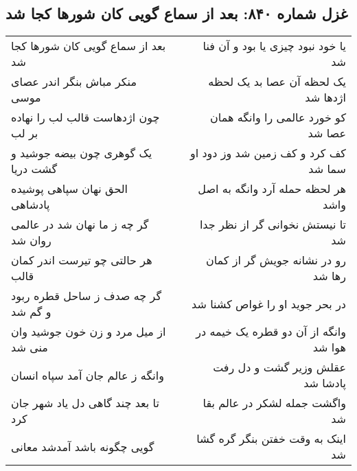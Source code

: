 \begin{center}
\section*{غزل شماره ۸۴۰: بعد از سماع گویی کان شورها کجا شد}
\label{sec:0840}
\begin{longtable}{l p{0.5cm} r}
بعد از سماع گویی کان شورها کجا شد
&&
یا خود نبود چیزی یا بود و آن فنا شد
\\
منکر مباش بنگر اندر عصای موسی
&&
یک لحظه آن عصا بد یک لحظه اژدها شد
\\
چون اژدهاست قالب لب را نهاده بر لب
&&
کو خورد عالمی را وانگه همان عصا شد
\\
یک گوهری چون بیضه جوشید و گشت دریا
&&
کف کرد و کف زمین شد وز دود او سما شد
\\
الحق نهان سپاهی پوشیده پادشاهی
&&
هر لحظه حمله آرد وانگه به اصل واشد
\\
گر چه ز ما نهان شد در عالمی روان شد
&&
تا نیستش نخوانی گر از نظر جدا شد
\\
هر حالتی چو تیرست اندر کمان قالب
&&
رو در نشانه جویش گر از کمان رها شد
\\
گر چه صدف ز ساحل قطره ربود و گم شد
&&
در بحر جوید او را غواص کشنا شد
\\
از میل مرد و زن خون جوشید وان منی شد
&&
وانگه از آن دو قطره یک خیمه در هوا شد
\\
وانگه ز عالم جان آمد سپاه انسان
&&
عقلش وزیر گشت و دل رفت پادشا شد
\\
تا بعد چند گاهی دل یاد شهر جان کرد
&&
واگشت جمله لشکر در عالم بقا شد
\\
گویی چگونه باشد آمدشد معانی
&&
اینک به وقت خفتن بنگر گره گشا شد
\\
\end{longtable}
\end{center}
